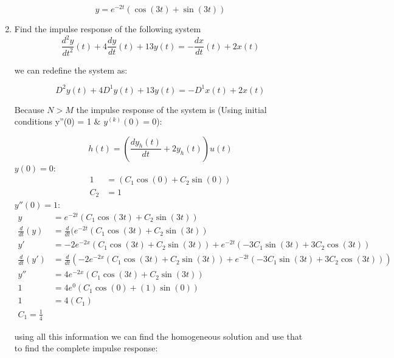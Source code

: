 \documentclass{article}
\begin{document}
\begin{enumerate}
\begin{equation}
    \boxed{y = e^{-2t}\left(\cos \left(3t\right)+\sin \left(3t\right)\right)}
\end{equation}
\newpage
\item Find the impulse response of the following system
\begin{equation}
    \frac{d^2y}{dt^2}(t) + 4\frac{dy}{dt}(t) + 13y(t) = - \frac{dx}{dt}(t) + 2x(t) 
\end{equation}
\begin{center}
    we can redefine the system as:
\end{center}
\begin{equation}
    D^2y(t)+4D^1y(t)+13y(t)= -D^1x(t)+2x(t)
\end{equation}
\begin{center}
    Because $N > M$ the impulse response of the system is (Using initial conditions y''(0) = 1 $\&$ $y^{(k)}(0) = 0$):
\end{center}
\begin{equation}
    h(t) = \left(\frac{dy_h(t)}{dt}+ 2y_h(t)\right)u(t)
\end{equation}
$y(0) = 0$:    
\begin{align}
    1 &= \left(C_1\cos \left(0\right)+C_2\sin \left(0\right)\right)\\
    C_2 &= 1
\end{align}
$y''(0) = 1$:    
\begin{align}
     y &= e^{-2t}(C_1\cos (3t)+C_2\sin(3t))\\
    \frac{d}{dt}(y) &= \frac{d}{dt}(e^{-2t}\left(C_1\cos \left(3t\right)+C_2\sin \left(3t\right)\right)\\
    y' &= -2e^{-2x}\left(C_1\cos \left(3t\right)+C_2\sin \left(3t\right)\right)+e^{-2t}\left(-3C_1\sin \left(3t\right)+ 3C_2\cos \left(3t\right)\right)\\
    \frac{d}{dt}(y') &= \frac{d}{dt}(-2e^{-2x}\left(C_1\cos \left(3t\right)+C_2\sin \left(3t\right)\right)+e^{-2t}\left(-3C_1\sin \left(3t\right)+ 3C_2\cos \left(3t\right)\right))\\
    y'' &= 4e^{-2x}\left(C_1\cos \left(3t\right)+C_2\sin \left(3t\right)\right)\\
    1 &= 4e^{0}\left(C_1\cos \left(0\right)+(1)\sin \left(0\right)\right)\\
    1 &= 4\left(C_1\right)\\
    C_1 = \frac{1}{4}
\end{align}
\begin{center}
    using all this information we can find the homogeneous solution and use that to find the complete impulse response:

\end{center}
\end{enumerate}
\end{document}
